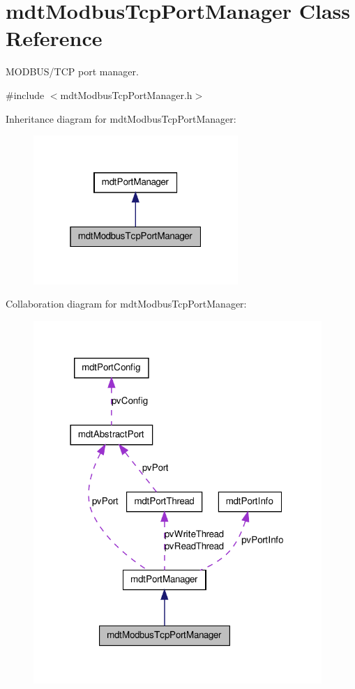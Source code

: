 \hypertarget{classmdt_modbus_tcp_port_manager}{
\section{mdtModbusTcpPortManager Class Reference}
\label{classmdt_modbus_tcp_port_manager}
}


MODBUS/TCP port manager.  




{\ttfamily \#include $<$mdtModbusTcpPortManager.h$>$}



Inheritance diagram for mdtModbusTcpPortManager:\nopagebreak
\begin{figure}[H]
\begin{center}
\leavevmode
\includegraphics[width=220pt]{classmdt_modbus_tcp_port_manager__inherit__graph}
\end{center}
\end{figure}


Collaboration diagram for mdtModbusTcpPortManager:\nopagebreak
\begin{figure}[H]
\begin{center}
\leavevmode
\includegraphics[width=310pt]{classmdt_modbus_tcp_port_manager__coll__graph}
\end{center}
\end{figure}
